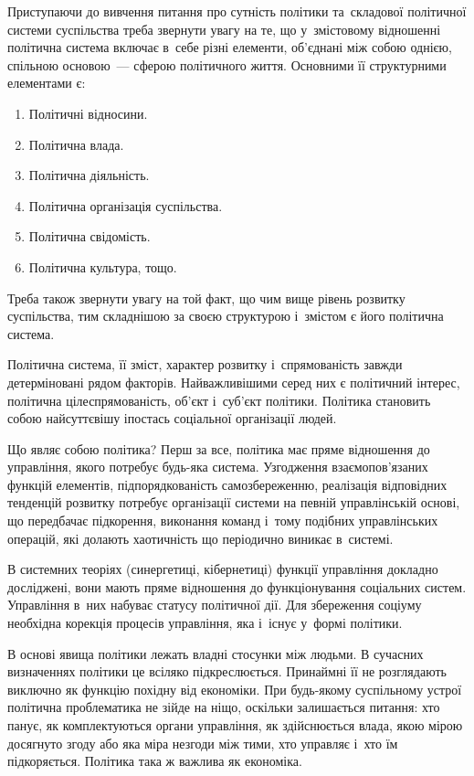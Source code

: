 \documentclass[a5paper,oneside,DIV=12,12pt,headings=small]{scrartcl}
\begin{document}
		Приступаючи до вивчення питання про сутність політики та~складової політичної системи суспільства треба звернути увагу на те, що у~змістовому відношенні політична система включає в~себе різні елементи, об'єднані між собою однією, спільною основою~— сферою політичного життя. Основними її структурними елементами є:
		\begin{enumerate}
			\item Політичні відносини.
			\item Політична влада.
			\item Політична діяльність.
			\item Політична організація суспільства.
			\item Політична свідомість.
			\item Політична культура, тощо.
		\end{enumerate}

		Треба також звернути увагу на той факт, що чим вище рівень розвитку суспільства, тим складнішою за своєю структурою і~змістом є його політична система.
		
		Політична система, її зміст, характер розвитку і~спрямованість завжди детерміновані рядом факторів. Найважливішими серед них є політичний інтерес, політична цілеспрямованість, об'\-єкт і~суб'\-єкт політики. Політика становить собою найсуттєвішу іпостась соціальної організації людей.
		
		Що являє собою політика? Перш за все, політика має пряме відношення до управління, якого потребує будь-яка система. Узгодження взаємопов'язаних функцій елементів, підпорядкованість самозбереженню, реалізація відповідних тенденцій розвитку потребує організації системи на певній управлінській основі, що передбачає підкорення, виконання команд і~тому подібних управлінських операцій, які долають хаотичність що періодично виникає в~системі.
		
		В системних теоріях (синергетиці, кібернетиці) функції управління докладно досліджені, вони мають пряме відношення до функціонування соціальних систем.  Управління в~них набуває статусу політичної дії. Для збереження соціуму необхідна корекція процесів управління, яка і~існує у~формі політики.
		
		В основі явища політики лежать владні стосунки між людьми. В сучасних визначеннях політики це всіляко підкреслюється. Принаймні її не розглядають виключно як функцію похідну від економіки. При будь-якому суспільному устрої політична проблематика не зійде на ніщо, оскільки залишається питання: хто панує, як комплектуються органи управління, як здійснюється влада, якою мірою досягнуто згоду або яка міра незгоди між тими, хто управляє і~хто їм підкоряється. Політика така ж важлива як економіка.
		
\end{document}
